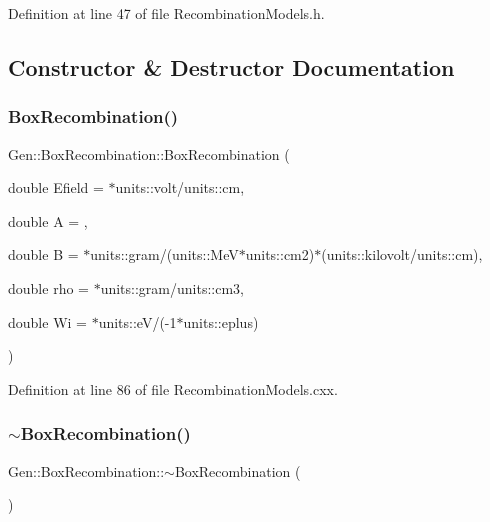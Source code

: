 Definition at line 47 of file Recombination\+Models.\+h.



\subsection{Constructor \& Destructor Documentation}
\mbox{\label{class_wire_cell_1_1_gen_1_1_box_recombination_ab981d288d5ec8ab5bbba0e281bb0daa2}} 
\subsubsection{\texorpdfstring{Box\+Recombination()}{BoxRecombination()}}
{\footnotesize\ttfamily Gen\+::\+Box\+Recombination\+::\+Box\+Recombination (\begin{DoxyParamCaption}\item[{double}]{Efield = {$\ast$units\+:\+:volt/units\+:\+:cm},  }\item[{double}]{A = {},  }\item[{double}]{B = {$\ast$units\+:\+:gram/(units\+:\+:MeV$\ast$units\+:\+:cm2)$\ast$(units\+:\+:kilovolt/units\+:\+:cm)},  }\item[{double}]{rho = {$\ast$units\+:\+:gram/units\+:\+:cm3},  }\item[{double}]{Wi = {$\ast$units\+:\+:eV/(-\/1$\ast$units\+:\+:eplus)} }\end{DoxyParamCaption})}



Definition at line 86 of file Recombination\+Models.\+cxx.

\mbox{\label{class_wire_cell_1_1_gen_1_1_box_recombination_a7cd263723366ecaf0cb87dc1fc752b5b}} 
\subsubsection{\texorpdfstring{$\sim$\+Box\+Recombination()}{~BoxRecombination()}}
{\footnotesize\ttfamily Gen\+::\+Box\+Recombination\+::$\sim$\+Box\+Recombination (\begin{DoxyParamCaption}{ }\end{DoxyParamCaption})\hspace{0.3cm}{\ttfamily [virtual]}}



